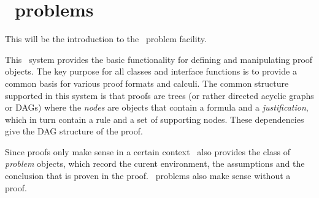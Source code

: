 \section{\keim\ problems}

This will be the introduction to the \keim\ problem facility.

This \keim\ system provides the basic functionality for defining and manipulating proof objects. The key
purpose for all classes and interface functions is to provide a common basis for various proof formats and
calculi.  The common structure supported in this system is that proofs are trees (or rather directed acyclic
graphs or DAGs) where the {\em nodes} are objects that contain a formula and a {\em justification}, which in turn
contain a rule and a set of supporting nodes. These dependencies give the DAG structure of the proof. 

Since proofs only make sense in a certain context \keim\ also provides the class of {\em problem} objects,
which record the curent environment, the assumptions and the conclusion that is proven in the proof. 
\keim\ problems also make sense without a proof.

